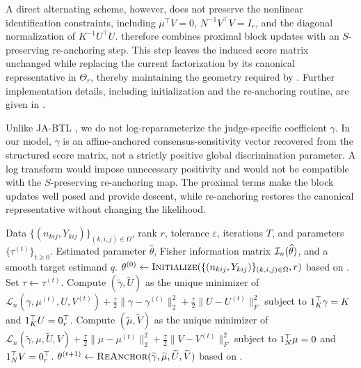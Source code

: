 \documentclass{article}
\begin{document}
\begin{bibunit}[unsrtnat]
A direct alternating scheme, however, does not preserve the nonlinear identification constraints, including \(\mu^\top V=0\), \(N^{-1}V^\top V=I_r\), and the diagonal normalization of \(K^{-1}U^\top U\). 
 therefore combines proximal block updates with an \(S\)-preserving re-anchoring step.
This step leaves the induced score matrix unchanged while replacing the current factorization by its canonical representative in \(\Theta_r\), thereby maintaining the geometry required by . 
Further implementation details, including initialization and the re-anchoring routine, are given in .

Unlike JA-BTL \citep{xu2026judgeaware}, we do not log-reparameterize the judge-specific coefficient \(\gamma\). 
In our model, \(\gamma\) is an affine-anchored consensus-sensitivity vector recovered from the structured score matrix, not a strictly positive global discrimination parameter. 
A log transform would impose unnecessary positivity and would not be compatible with the \(S\)-preserving re-anchoring map. The proximal terms make the block updates well posed and provide descent, while re-anchoring restores the canonical representative without changing the likelihood.



\begin{algorithm}[t]
    \caption{Proximal anchored alternating MLE for heterogeneous judge-aware (HJA) ranking}
    \label{alg:mle}
    \begin{algorithmic}[1]
    \Require Data $\{(n_{kij},Y_{kij})\}_{(k,i,j)\in\Omega}$, rank \(r\), tolerance \(\varepsilon\), iterations \(T\), and parameters \(\{\tau^{(t)}\}_{t\geq 0}\).
    \Ensure Estimated parameter $\hat\theta$, Fisher information matrix $\cI_n(\hat\theta)$, and a smooth target estimand \(q\).
    \State $\theta^{(0)} \gets \textsc{Initialize}(\{(n_{kij},Y_{kij})\}_{(k,i,j)\in\Omega},r)$ based on .
        \State Set \(\tau \gets \tau^{(t)}\).
        \State Compute \((\tilde{\gamma},\tilde{U})\) as the unique minimizer of
        \(
        \mathcal{L}_n(\gamma,\mu^{(t)},U,V^{(t)})
        + \frac{\tau}{2}\|\gamma-\gamma^{(t)}\|_2^2
        + \frac{\tau}{2}\|U-U^{(t)}\|_F^2
        \)
        subject to \(\one_K^\top \gamma=K\) and \(\one_K^\top U=\zero_r^\top\).
        \State Compute \((\tilde{\mu},\tilde{V})\) as the unique minimizer of
        \(
        \mathcal{L}_n(\tilde{\gamma},\mu,\tilde{U},V)
        + \frac{\tau}{2}\|\mu-\mu^{(t)}\|_2^2
        + \frac{\tau}{2}\|V-V^{(t)}\|_F^2
        \)
        subject to \(\one_N^\top \mu=0\) and \(\one_N^\top V=\zero_r^\top\).
        \State \(\theta^{(t+1)} \gets \textsc{ReAnchor}(\tilde{\gamma},\tilde{\mu},\tilde{U},\tilde{V})\) based on .
        

\end{algorithmic}
\end{algorithm}
\end{bibunit}
\end{document}
